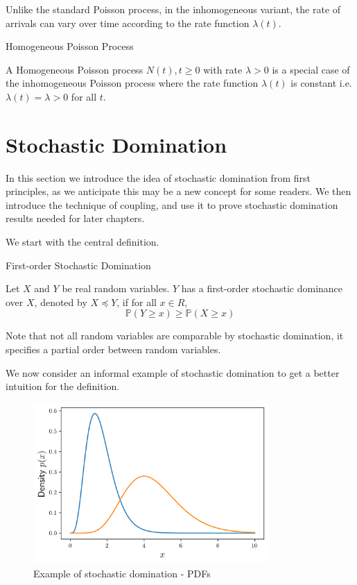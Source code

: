 Unlike the standard Poisson process, in the inhomogeneous variant, the rate of arrivals can vary over time according to the rate function $\lambda(t)$. 



\begin{definition}
	Homogeneous Poisson Process

	\noindent
	A Homogeneous Poisson process ${N(t), t \geq 0}$ with rate $\lambda > 0$ is a special case of the inhomogeneous Poisson process where the rate function $\lambda(t)$ is constant i.e. $\lambda(t)=\lambda > 0$ for all $t$.
\end{definition}


\section{Stochastic Domination}

In this section we introduce the idea of stochastic domination from first principles, as we anticipate this may be a new concept for some readers. We then introduce the technique of coupling, and use it to prove stochastic domination results needed for later chapters.

We start with the central definition.

\begin{definition}
	First-order Stochastic Domination

	\noindent
	Let $X$ and $Y$ be real random variables. $Y$ has a first-order stochastic dominance over $X$, denoted by $X \preceq Y$, if for all $x \in R$, 
	$$
		\mathbb{P}(Y \geq x) \geq \mathbb{P}(X \geq x)
	$$
\end{definition}

Note that not all random variables are comparable by stochastic domination, it specifies a partial order between random variables. %

We now consider an informal example of stochastic domination to get a better intuition for the definition.

\begin{figure}[h]
	\centering
	\includegraphics[width=0.8\textwidth]{./figures/stochastic_domination_pdf.png}
	\caption{Example of stochastic domination - PDFs}
	\label{fig:stochDomPDFs}
\end{figure}

